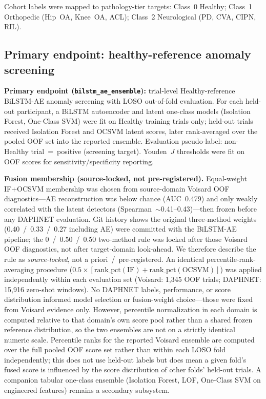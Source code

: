 Cohort labels were mapped to pathology-tier targets: Class~0 Healthy; Class~1 Orthopedic (Hip~OA, Knee~OA, ACL); Class~2 Neurological (PD, CVA, CIPN, RIL).

\subsection{Primary endpoint: healthy-reference anomaly screening}
\label{sec:primary}

\textbf{Primary endpoint (\texttt{bilstm\_ae\_ensemble}):} trial-level Healthy-reference BiLSTM-AE anomaly screening with LOSO out-of-fold evaluation. For each held-out participant, a BiLSTM autoencoder and latent one-class models (Isolation Forest, One-Class SVM) were fit on Healthy training trials only; held-out trials received Isolation Forest and OCSVM latent scores, later rank-averaged over the pooled OOF set into the reported ensemble. Evaluation pseudo-label: non-Healthy trial~=~positive (screening target). Youden~$J$ thresholds were fit on OOF scores for sensitivity/specificity reporting.

\textbf{Fusion membership (source-locked, not pre-registered).} Equal-weight IF+OCSVM membership was chosen from source-domain Voisard OOF diagnostics---AE reconstruction was below chance (AUC~0.479) and only weakly correlated with the latent detectors (Spearman~$\sim$0.41--0.43)---then frozen before any DAPHNET evaluation. Git history shows the original three-method weights (0.40~/~0.33~/~0.27 including AE) were committed with the BiLSTM-AE pipeline; the 0~/~0.50~/~0.50 two-method rule was locked after those Voisard OOF diagnostics, not after target-domain look-ahead. We therefore describe the rule as \emph{source-locked}, not a priori~/~pre-registered. An identical percentile-rank-averaging procedure ($0.5\times[\mathrm{rank\_pct}(\mathrm{IF})+\mathrm{rank\_pct}(\mathrm{OCSVM})]$) was applied independently within each evaluation set (Voisard: 1{,}345 OOF trials; DAPHNET: 15{,}916 zero-shot windows). No DAPHNET labels, performance, or score distribution informed model selection or fusion-weight choice---those were fixed from Voisard evidence only. However, percentile normalization in each domain is computed relative to that domain's own score pool rather than a shared frozen reference distribution, so the two ensembles are not on a strictly identical numeric scale. Percentile ranks for the reported Voisard ensemble are computed over the full pooled OOF score set rather than within each LOSO fold independently; this does not use held-out labels but does mean a given fold's fused score is influenced by the score distribution of other folds' held-out trials. A companion tabular one-class ensemble (Isolation Forest, LOF, One-Class SVM on engineered features) remains a secondary subsystem.

